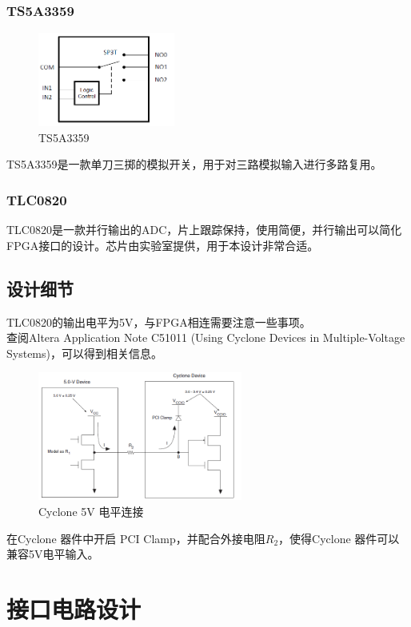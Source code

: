 \documentclass[16pt,a4paper]{article}
\begin{document}
\subsubsection{TS5A3359}
\begin{figure}[H]
\centering
\includegraphics[width=0.4\textwidth]{TS5A3359.png}
\caption{TS5A3359}
\end{figure}
TS5A3359是一款单刀三掷的模拟开关，用于对三路模拟输入进行多路复用。

\subsubsection{TLC0820}
TLC0820是一款并行输出的ADC，片上跟踪保持，使用简便，并行输出可以简化FPGA接口的设计。芯片由实验室提供，用于本设计非常合适。

\subsection{设计细节}
TLC0820的输出电平为5V，与FPGA相连需要注意一些事项。\\

查阅Altera Application Note C51011 (Using Cyclone Devices in Multiple-Voltage Systems)，可以得到相关信息。
\begin{figure}[H]
\centering
\includegraphics[width=0.6\textwidth]{5V.png}
\caption{Cyclone 5V 电平连接}
\end{figure}
在Cyclone 器件中开启 PCI Clamp，并配合外接电阻$R_2$，使得Cyclone 器件可以兼容5V电平输入。

\section{接口电路设计}

\end{document}
